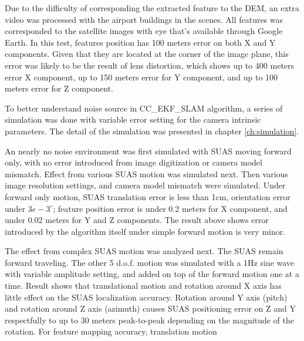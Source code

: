 Due to the difficulty of corresponding the extracted feature to the
DEM, an extra video was processed with the airport buildings in the
scenes. All features was corresponded to the satellite images with eye
that's available through Google Earth. In this test, features position
has 100 meters error on both X and Y components. Given that they are
located at the corner of the image plane, this error was likely to be
the result of lens distortion, which shows up to 400 meters error X
component, up to 150 meters error for Y component, and up to 100
meters error for Z component. 

To better understand noise source in CC\_EKF\_SLAM algorithm, a series
of simulation was done with variable error setting for the camera
intrinsic parameters. The detail of the simulation was presented in
chapter \ref{ch:simulation}. 

An nearly no noise environment was first simulated with SUAS moving
forward only, with no error introduced from image digitization or
camera model mismatch. Effect from various SUAS motion was simulated
next. Then various image resolution settings, and camera model
mismatch were simulated. Under forward only motion, SUAS translation
error is less than 1cm, orientation error under $3e-3^\circ$; feature
position error is under 0.2 meters for X component, and under 0.02
meters for Y and Z components. The result above shows error introduced
by the algorithm itself under simple forward motion is very minor.

The effect from complex SUAS motion was analyzed next. The SUAS remain
forward traveling. The other 5 d.o.f. motion was simulated with a 1Hz
sine wave with variable amplitude setting, and added on top of the
forward motion one at a time. Result shows that translational motion
and rotation around X axis has little effect on the SUAS localization
accuracy. Rotation around Y axis (pitch) and rotation around Z axis
(azimuth) causes SUAS positioning error on Z and Y respectfully to up to
30 meters peak-to-peak depending on the magnitude of the rotation. For
feature mapping accuracy, translation motion

